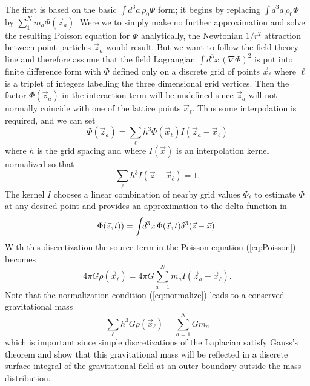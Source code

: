     The first is based on the basic $\int\!\!d^3a\,\rho_0 \Phi$ form;
it begins by replacing $\int\!\!d^3a\,\rho_0 \Phi$ by $\sum_1^N m_a
\Phi(\vec z_a)$.  
    Were we to simply make no further approximation and solve the
resulting Poisson equation for $\Phi$ analytically, the Newtonian
$1/r^2$ attraction between point particles $\vec z_a$ would result. 
    But we want to follow the field theory line and therefore assume
that the field Lagrangian $\int\!\!d^3x\,(\nabla \Phi)^2$ is put into
finite difference form with $\Phi$ defined only on a discrete grid of
points $\vec x_\ell$ where $\ell$ is a triplet of integers labelling
the three dimensional grid vertices.  
    Then the factor $\Phi(\vec z_a)$ in the interaction term will be
undefined since $\vec z_a$ will not normally coincide with one of the
lattice points $\vec x_\ell$.  
    Thus some interpolation is required, and we can set
    \begin{equation}\label{eq:interpolate}
    \Phi(\vec z_a) = \sum_\ell h^3 \Phi(\vec x_\ell) I(\vec z_a - \vec x_\ell)
    \end{equation}
    where $h$ is the grid spacing and
    where $I(\vec x)$ is an interpolation kernel normalized so that 
    \begin{equation}\label{eq:normalize}
            \sum_\ell h^3 I(\vec z -\vec x_\ell) = 1 . 
    \end{equation}
    The kernel $I$ chooses a linear combination of nearby grid values
$\Phi_\ell$ to estimate $\Phi$ at any desired point and provides an
approximation to the delta function in 
    \begin{equation}\label{eq:approxDelta}
    \Phi({\vec z},t)) = \int\!\!d^3x\,\Phi({\vec x},t) \delta^3({\vec z}-{\vec x}) .
    \end{equation}
    With this discretization the source term in the Poisson equation
(\ref{eq:Poisson}) becomes
    \begin{equation}\label{eq:gravSource1}
    4 \pi G \rho(\vec x_\ell) =
          4 \pi G \sum_{a=1}^{N} m_a I({\vec z_a} - {\vec x_\ell}).
    \end{equation}
    Note that the normalization condition (\ref{eq:normalize}) leads
to a conserved gravitational mass
    \begin{equation}\label{eq:gravMass}
    \sum_\ell h^3 G \rho(\vec x_\ell) =
           \sum_{a=1}^{N} G m_a 
    \end{equation}
    which is important since simple discretizations of the Laplacian
satisfy Gauss's theorem and show that this gravitational mass will be
reflected in a discrete surface integral of the gravitational field at
an outer boundary outside the mass distribution.


